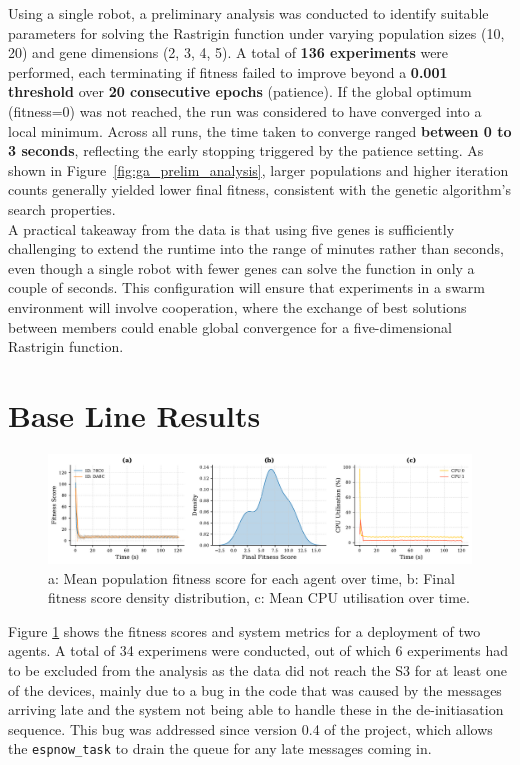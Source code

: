 \documentclass[conference]{IEEEtran}
\begin{document}
Using a single robot, a preliminary analysis was conducted to identify suitable parameters for solving the Rastrigin function under varying population sizes (10, 20) and gene dimensions (2, 3, 4, 5). A total of \textbf{136 experiments} were performed, each terminating if fitness failed to improve beyond a \textbf{0.001 threshold} over \textbf{20 consecutive epochs} (patience). %
If the global optimum (fitness=0) was not reached, the run was considered to have converged into a local minimum. Across all runs, the time taken to converge ranged \textbf{between 0 to 3 seconds}, reflecting the early stopping triggered by the patience setting. As shown in Figure~\ref{fig:ga_prelim_analysis}, larger populations and higher iteration counts generally yielded lower final fitness, consistent with the genetic algorithm’s search properties.\\

A practical takeaway from the data is that using five genes is sufficiently challenging to extend the runtime into the range of minutes rather than seconds, even though a single robot with fewer genes can solve the function in only a couple of seconds. This configuration will ensure that experiments in a swarm environment will involve cooperation, where the exchange of best solutions between members could enable global convergence for a five-dimensional Rastrigin function.

\newpage
\section{Base Line Results}

\begin{figure}[t]
  \centering
  \includegraphics[width=1\textwidth]{base_fitness_stats.pdf}
  \caption{a: Mean population fitness score for each agent over time,  b: Final fitness score density distribution, c: Mean CPU utilisation over time.}
  \label{fig:base_fitness_stats}
\end{figure}

Figure \ref{fig:base_fitness_stats} shows the fitness scores and system metrics for a deployment of two agents. A total of 34 experimens were conducted, out of which 6 experiments had to be excluded from the analysis as the data did not reach the S3 for at least one of the devices, mainly due to a bug in the code that was caused by the messages arriving late and the system not being able to handle these in the de-initiasation sequence. This bug was addressed since version 0.4 of the project, which allows the \texttt{espnow\_task} to drain the queue for any late messages coming in.\\
\end{document}
